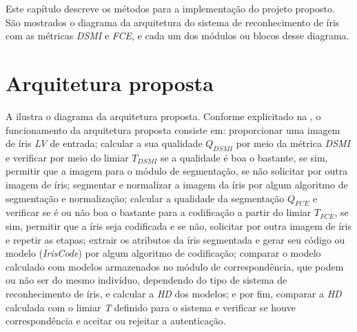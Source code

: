 
\par Este capítulo descreve os métodos para a implementação do projeto proposto. São mostrados o diagrama da arquitetura do sistema de reconhecimento de íris com as métricas \textit{\acrshort{DSMI}} e \textit{\acrshort{FCE}}, e cada um dos módulos ou blocos desse diagrama.


\section{Arquitetura proposta} \label{sec:metodologia:arquitetura}


\par A  ilustra o diagrama da arquitetura proposta. Conforme explicitado na , o funcionamento da arquitetura proposta consiste em: proporcionar uma imagem de íris \textit{\acrfull{LV}} de entrada; calcular a sua qualidade $Q_{DSMI}$ por meio da métrica \textit{\acrshort{DSMI}} e verificar por meio do limiar $T_{DSMI}$ se a qualidade é boa o bastante, se sim, permitir que a imagem para o módulo de segmentação, se não solicitar por outra imagem de íris; segmentar e normalizar a imagem da íris por algum algoritmo de segmentação e normalização; calcular a qualidade da segmentação $Q_{FCE}$ e verificar se é ou não boa o bastante para a codificação a partir do limiar $T_{FCE}$, se sim, permitir que a íris seja codificada e se não, solicitar por outra imagem de íris e repetir as etapas; extrair os atributos da íris segmentada e gerar seu código ou modelo (\textit{IrisCode}) por algum algoritmo de codificação; comparar o modelo calculado com modelos armazenados no módulo de correspondência, que podem ou não ser do mesmo indivíduo, dependendo do tipo de sistema de reconhecimento de íris, e calcular a \textit{\acrfull{HD}} dos modelos; e por fim, comparar a \textit{\acrshort{HD}} calculada com o limiar \textit{T} definido para o sistema e verificar se houve correspondência e aceitar ou rejeitar a autenticação.

